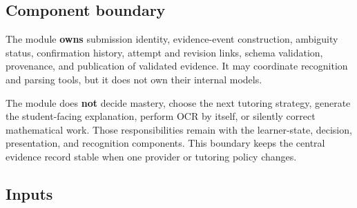 \documentclass[11pt]{article}
\begin{document}
\subsection{Component boundary}

The module \textbf{owns} submission identity, evidence-event construction, ambiguity status, confirmation history, attempt and revision links, schema validation, provenance, and publication of validated evidence. It may coordinate recognition and parsing tools, but it does not own their internal models.

The module does \textbf{not} decide mastery, choose the next tutoring strategy, generate the student-facing explanation, perform OCR by itself, or silently correct mathematical work. Those responsibilities remain with the learner-state, decision, presentation, and recognition components. This boundary keeps the central evidence record stable when one provider or tutoring policy changes.

\subsection{Inputs}
\end{document}
